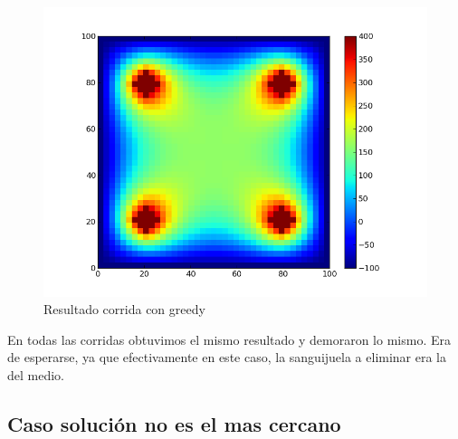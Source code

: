 \begin{figure}[htb]
\begin{center}
\includegraphics[scale=0.40]{imagenes/random_2.png} 
\caption{Resultado corrida con greedy} 
\end{center}
\end{figure}


En todas las corridas obtuvimos el mismo resultado y demoraron lo mismo. Era de esperarse, ya que efectivamente en este caso, la sanguijuela a eliminar era la del medio.
\newpage

\subsection{Caso solución no es el mas cercano}


